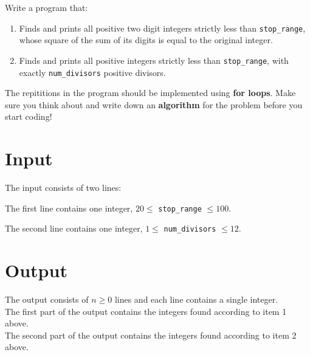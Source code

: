 
Write a program that: 
\begin{enumerate} 
    \item Finds and prints all positive two digit integers strictly less than \texttt{stop\_range}, whose square of the sum of its digits is equal to the original integer.
   \item Finds and prints all positive integers strictly less than \texttt{stop\_range}, with exactly \texttt{num\_divisors} positive divisors.
\end{enumerate}

The repititions in the program should be implemented using \textbf{for loops}.
Make sure you think about and write down an \textbf{algorithm} for the problem before you start coding!

\section*{Input}
The input consists of two lines: 

The first line contains one integer, $20 \leq$ \texttt{stop\_range} $\leq 100$. 

The second line contains one integer, $1 \leq$ \texttt{num\_divisors} $\leq 12$. \\

\section*{Output}
The output consists of $n \ge 0$ lines and each line contains a single integer. \\
The first part of the output contains the integers found according to item 1 above. \\
The second part of the output contains the integers found according to item 2 above. \\
